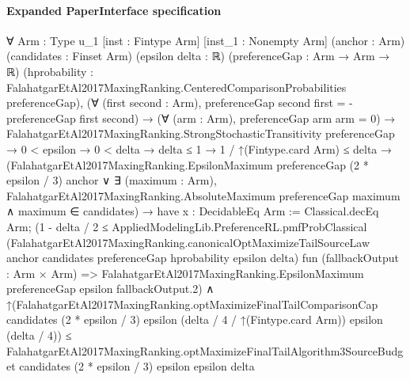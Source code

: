 \documentclass[10pt]{article}
\begin{document}
\paragraph{Expanded PaperInterface specification}
\begin{ReviewVerbatim}
∀ {Arm : Type u_1} [inst : Fintype Arm] [inst_1 : Nonempty Arm] (anchor : Arm) (candidates : Finset Arm)
  (epsilon delta : ℝ) (preferenceGap : Arm → Arm → ℝ)
  (hprobability : FalahatgarEtAl2017MaxingRanking.CenteredComparisonProbabilities preferenceGap),
  (∀ (first second : Arm), preferenceGap second first = -preferenceGap first second) →
    (∀ (arm : Arm), preferenceGap arm arm = 0) →
      FalahatgarEtAl2017MaxingRanking.StrongStochasticTransitivity preferenceGap →
        0 < epsilon →
          0 < delta →
            delta ≤ 1 →
              1 / ↑(Fintype.card Arm) ≤ delta →
                (FalahatgarEtAl2017MaxingRanking.EpsilonMaximum preferenceGap (2 * epsilon / 3) anchor ∨
                    ∃ (maximum : Arm),
                      FalahatgarEtAl2017MaxingRanking.AbsoluteMaximum preferenceGap maximum ∧ maximum ∈ candidates) →
                  have x : DecidableEq Arm := Classical.decEq Arm;
                  (1 - delta / 2 ≤
                      AppliedModelingLib.PreferenceRL.pmfProbClassical
                        (FalahatgarEtAl2017MaxingRanking.canonicalOptMaximizeTailSourceLaw anchor candidates
                          preferenceGap hprobability epsilon delta)
                        fun (fallbackOutput : Arm × Arm) =>
                        FalahatgarEtAl2017MaxingRanking.EpsilonMaximum preferenceGap epsilon fallbackOutput.2) ∧
                    ↑(FalahatgarEtAl2017MaxingRanking.optMaximizeFinalTailComparisonCap candidates (2 * epsilon / 3)
                          epsilon (delta / 4 / ↑(Fintype.card Arm)) epsilon (delta / 4)) ≤
                      FalahatgarEtAl2017MaxingRanking.optMaximizeFinalTailAlgorithm3SourceBudget candidates
                        (2 * epsilon / 3) epsilon epsilon delta
\end{ReviewVerbatim}
\end{document}
